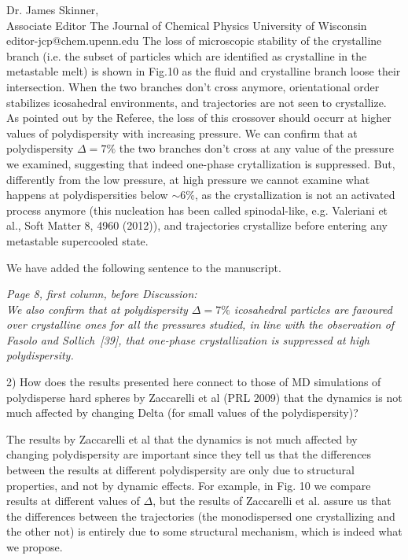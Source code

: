\documentclass[a4paper, rebuttal, parskip=true, firsthead=false, fromemail=false, foldmarks=false]{scrlttr2}
\begin{document}
\begin{letter}{Dr. James Skinner,\\Associate Editor
The Journal of Chemical Physics
University of Wisconsin\\
editor-jcp@chem.upenn.edu }
The loss of microscopic stability of the crystalline branch (i.e. the subset of particles which are identified as crystalline in the metastable melt)
is shown in Fig.10 as the fluid and crystalline branch loose their intersection. When the two branches don't cross anymore, orientational order
stabilizes icosahedral environments, and trajectories are not seen to crystallize. As pointed out by the Referee,
the loss of this crossover should occurr at higher values of polydispersity with
increasing pressure. We can confirm that at polydispersity $\Delta=7\%$ the two branches don't cross at any value of the pressure we examined, suggesting
that indeed one-phase crytallization is suppressed. But, differently from the low pressure, at high pressure we cannot examine
what happens at polydispersities below $\sim 6\%$, as the crystallization is not an activated process anymore
(this nucleation has been called spinodal-like, e.g. Valeriani et al., Soft Matter 8, 4960 (2012)), and trajectories crystallize
before entering any metastable supercooled state.

We have added the following sentence to the manuscript.

{\it Page 8, first column, before Discussion:\\
We also confirm that at polydispersity $\Delta=7\%$ icosahedral particles are favoured over crystalline ones for
all the pressures studied, in line with the observation of Fasolo and Sollich~[39], that
one-phase crystallization is suppressed at high polydispersity.
}



\begin{quotationi}
2) How does the results presented here connect to those of MD simulations of polydisperse hard spheres by Zaccarelli et al (PRL 2009) that the dynamics is not much affected by changing Delta (for small values of the polydispersity)?
\end{quotationi}

The results by Zaccarelli et al that the dynamics is not much affected by changing polydispersity are important since they tell
us that the differences between the results at different polydispersity are only due to structural properties, and not by
dynamic effects. For example, in Fig. 10 we compare results at different values of $\Delta$, but the results of Zaccarelli et al.
assure us that the differences between the trajectories (the monodispersed one crystallizing and the other not) is entirely due
to some structural mechanism, which is indeed what we propose.


\end{letter}
\end{document}
